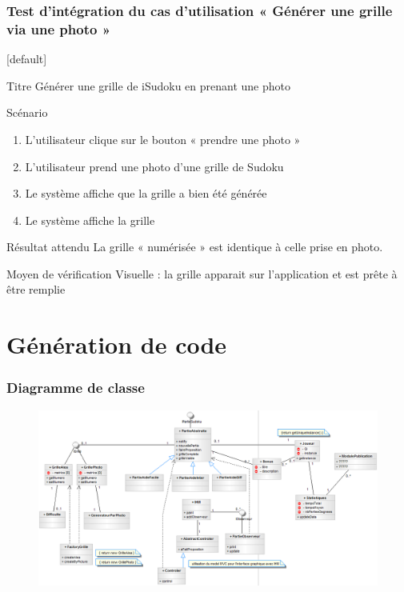 \documentclass{beamer}
\begin{document}
\begin{frame}
  \frametitle{Test d’intégration  du cas d'utilisation « Générer une grille via une photo »}
  [default]
  \begin{block}{\footnotesize{Titre}}
    \scriptsize{Générer une grille de iSudoku en prenant une photo}
  \end{block}
  \pause
  \begin{block}{\footnotesize{Scénario}}
    \begin{enumerate}
      [circle]
      \item
        \scriptsize{L’utilisateur clique sur le bouton « prendre une photo »}
      \item
        \scriptsize{L’utilisateur prend une photo d’une grille de Sudoku}
      \item
        \scriptsize{Le système affiche que la grille a bien été générée}
      \item
        \scriptsize{Le système affiche la grille} 
    \end{enumerate}
  \end{block}
  \pause
  \begin{block}{\footnotesize{Résultat attendu}}
    \scriptsize{La grille « numérisée » est identique à celle prise en photo.}
  \end{block}
  \begin{block}{\footnotesize{Moyen de vérification}}
    \scriptsize{Visuelle : la grille apparait sur l’application et est prête à être remplie}
  \end{block}
\end{frame}

\section{Génération de code}

\begin{frame}
\frametitle{Diagramme de classe}
  \begin{figure}[h]
      \includegraphics[scale=0.4]{DiagrammeClasseGenere.png}
    \end{figure}
\end{frame}
\end{document}
